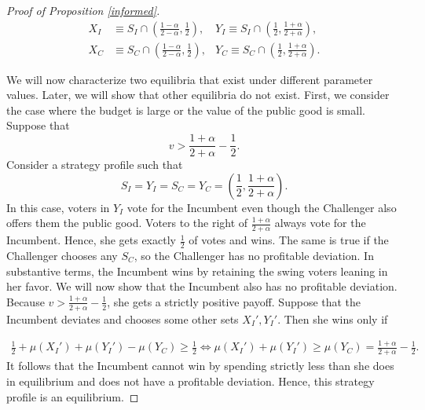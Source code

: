 \documentclass[12pt,english]{article}
\begin{document}
\begin{proof}[Proof of Proposition \ref{informed}]
\begin{align*}
X_I &\equiv S_I \cap  (\frac{1 - \alpha}{2 - \alpha}, \frac{1}{2}), 
&Y_I \equiv S_I \cap  (\frac{1}{2}, \frac{1 + \alpha}{2 + \alpha}),\\
X_C &\equiv S_C \cap  (\frac{1 - \alpha}{2 - \alpha}, \frac{1}{2}),
&Y_C \equiv S_C \cap   (\frac{1}{2}, \frac{1 + \alpha}{2 + \alpha}).
\end{align*}

We will now characterize two equilibria that exist under different parameter values. Later, we will show that other equilibria do not exist. First, we consider the case where the budget is large or the value of the public good is
small. Suppose that 
\begin{equation*}
v > \frac{1 + \alpha}{2 + \alpha} - \frac{1}{2}. 
\end{equation*}
Consider a strategy profile such that 
\begin{equation*}
S_I = Y_I =  S_C = Y_C = (\frac{1}{2}, \frac{1 + \alpha}{2 + \alpha}).
\end{equation*}
In this case, voters in $Y_I$ vote for the Incumbent even though the Challenger also offers them the public good. Voters to the right of $\frac{1 + \alpha}{2 + \alpha}$ always vote for the Incumbent. Hence, she gets exactly $\frac{1}{2}$ of votes and wins. The same is true if the Challenger chooses any $S_C$, so the Challenger has no profitable deviation. In substantive terms, the Incumbent wins by retaining the swing voters leaning in her favor. We will now show that the Incumbent also has no profitable deviation. Because $v > \frac{1 + \alpha}{2 + \alpha} - \frac{1}{2}$, she gets a strictly positive payoff. Suppose that the Incumbent deviates and chooses some other sets $X_I', Y_I'$. Then she wins only if 

\begin{equation*}
\begin{aligned}
\frac{1}{2} + \mu(X_I') + \mu(Y_I') - \mu(Y_C)  \geq \frac{1}{2} \Leftrightarrow \mu(X_I') + \mu(Y_I') \geq \mu(Y_C) = \frac{1 + \alpha}{2 + \alpha} - \frac{1}{2}.
\end{aligned}
\end{equation*}
It follows that the Incumbent cannot win by spending strictly less than she does in equilibrium and does not have a profitable deviation. Hence, this strategy profile is an equilibrium.


\end{proof}
\end{document}
